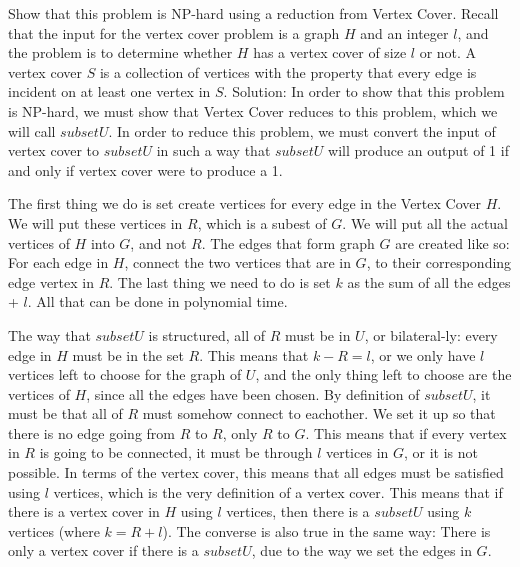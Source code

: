 \documentclass{article}
\begin{document}
\begin{enumerate}
Show that this problem is NP-hard using a reduction from Vertex Cover. Recall that the input for the
\newline vertex cover problem is a graph $H$ and an integer $l$, and the problem is to determine whether $H$ has a
\newline vertex cover of size $l$ or not. A vertex cover $S$ is a collection of vertices with the property that every
\newline edge is incident on at least one vertex in $S$.
\newline
\newline Solution: In order to show that this problem is NP-hard, we must show that Vertex Cover reduces to this problem, which we will call $subsetU$. In order to reduce this problem, we must convert the input of vertex cover to $subsetU$ in such a way that $subsetU$ will produce an output of 1 if and only if vertex cover were to produce a 1. 

The first thing we do is set create vertices for every edge in the Vertex Cover $H$. We will put these vertices in $R$, which is a subest of $G$.  We will put all the actual vertices of $H$ into $G$, and not $R$. The edges that form graph $G$ are created like so: For each edge in $H$, connect the two vertices that are in $G$, to their corresponding edge vertex in $R$. The last thing we need to do is set $k$ as the sum of all the edges + $l$. All that can be done in polynomial time.

The way that $subsetU$ is structured, all of $R$ must be in $U$, or bilateral-ly: every edge in $H$ must be in the set $R$. This means that $k-R = l$, or we only have $l$ vertices left to choose for the graph of $U$, and the only thing left to choose are the vertices of $H$, since all the edges have been chosen. By definition of $subsetU$, it must be that all of $R$ must somehow connect to eachother. We set it up so that there is no edge going from $R$ to $R$, only $R$ to $G$. This means that if every vertex in $R$ is going to be connected, it must be through $l$ vertices in $G$, or it is not possible. In terms of the vertex cover, this means that all edges must be satisfied using $l$ vertices, which is the very definition of a vertex cover. This means that if there is a vertex cover in $H$ using $l$ vertices, then there is a $subsetU$ using $k$ vertices (where $k = R + l$). The converse is also true in the same way: There is only a vertex cover if there is a $subsetU$, due to the way we set the edges in $G$.


\end{enumerate}
\end{document}
